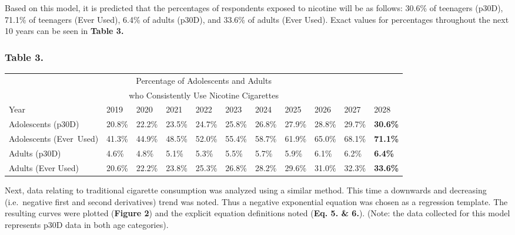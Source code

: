 Based on this model, it is predicted that the percentages of respondents exposed to nicotine will be as follows: 30.6\% of teenagers (p30D), 71.1\% of teenagers (Ever Used), 6.4\% of adults (p30D), and 33.6\% of adults (Ever Used). Exact values for percentages throughout the next 10 years can be seen in \textbf{Table 3.}

\subsubsection*{Table 3.}
\begin{center}
    \begin{tabular}{p{1in} p{0.4in} p{0.4in} p{0.4in} p{0.4in} p{0.4in} p{0.4in} p{0.4in} p{0.4in} p{0.4in} p{0.4in}}
        \toprule
        \multicolumn{11}{c}{Percentage of Adolescents and Adults}\\
        \multicolumn{11}{c}{who Consistently Use Nicotine Cigarettes}\\    
        \midrule
        Year & 2019 & 2020 & 2021 & 2022 & 2023 & 2024 & 2025 & 2026 & 2027 & 2028 \\
        \midrule
        Adolescents (p30D) & 20.8\% & 22.2\% & 23.5\% & 24.7\% & 25.8\% & 26.8\% & 27.9\% & 28.8\% & 29.7\% & \textbf{30.6\%} \\
        Adolescents (Ever~Used) & 41.3\% & 44.9\% & 48.5\% & 52.0\% & 55.4\% & 58.7\% & 61.9\% & 65.0\% & 68.1\% & \textbf{71.1\%} \\
        Adults (p30D) & 4.6\% & 4.8\% & 5.1\% & 5.3\% & 5.5\% & 5.7\% & 5.9\% & 6.1\% & 6.2\% & \textbf{6.4\%} \\
        Adults (Ever Used) & 20.6\% & 22.2\% & 23.8\% & 25.3\% & 26.8\% & 28.2\% & 29.6\% & 31.0\% & 32.3\% & \textbf{33.6\%} \\
        \bottomrule
    \end{tabular}
\end{center}

Next, data relating to traditional cigarette consumption was analyzed using a similar method. This time a downwards and decreasing (i.e.\ negative first and second derivatives) trend was noted. Thus a negative exponential equation was chosen as a regression template. The resulting curves were plotted (\textbf{Figure 2}) and the explicit equation definitions noted (\textbf{Eq. 5. \& 6.}). (Note: the data collected for this model represents p30D data in both age categories).


